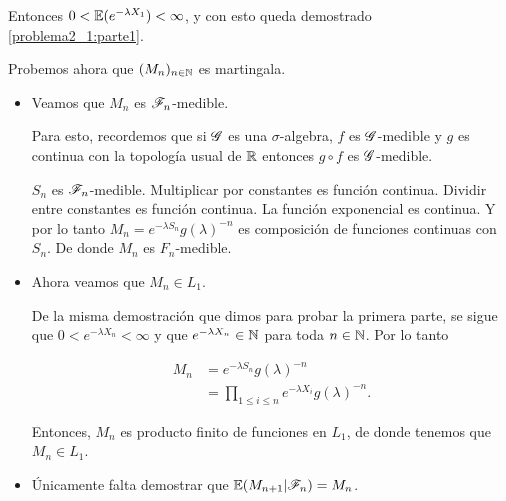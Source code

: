     Entonces $0 < \mathbb{E}(e^{-\lambda X_1}) < \infty$, y con esto queda demostrado \eqref{problema2_1:parte1}.
    
    Probemos ahora que $(M_n)_{n \in \mathbb{N}}$ es martingala.
    
    \begin{itemize}
        \item 
            Veamos que $M_n$ es $\mathscr{F}_n$-medible.\par\null
            
            Para esto, recordemos que si $\mathscr{G}$ es una $\sigma$-algebra, $f$ es $\mathscr{G}$-medible y $g$ es continua
            con la topología usual de $\mathbb{R}$ entonces $g \circ f$ es $\mathscr{G}$-medible.\par\null
            
            $S_n$ es $\mathscr{F}_n$-medible. Multiplicar por constantes es función continua. Dividir entre constantes 
            es función continua. La función exponencial es continua. Y por lo tanto $M_n=e^{-\lambda S_n}g(\lambda)^{-n}$ 
            es composición de funciones continuas con $S_n$. De donde $M_n$ es $F_n$-medible.\par\null
         
        \item 
            Ahora veamos que $M_n \in L_1$.\par\null
            
            De la misma demostración que dimos para probar la primera parte, se sigue 
            que $0 < e^{-\lambda X_n} < \infty$ y que $e^{-\lambda X_n} \in \mathbb{N}$ para toda $n \in \mathbb{N}$. Por lo tanto
            
            \begin{align}
                M_n         &=      e^{-\lambda S_n}g(\lambda)^{-n} \\
                            &=      \prod_{1 \leq i \leq n} e^{-\lambda X_i} g(\lambda)^{-n}. 
            \end{align}\par\null
            
            Entonces, $M_n$ es producto finito de funciones en $L_1$, de donde tenemos que $M_n \in L_1$.\par\null
            
         \item
            Únicamente falta demostrar que $\mathbb{E}(M_{n+1} | \mathscr{F}_n) = M_n$.\par\null
            

\end{itemize}
